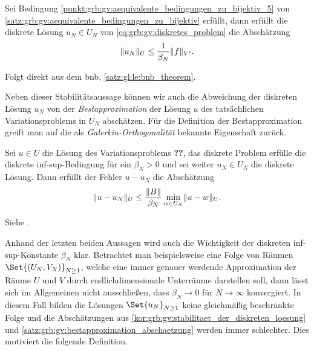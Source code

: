 \begin{Korollar}
\label{kor:grb:gv:stabilitaet_der_diskreten_loesung}
    Sei Bedingung \ref{punkt:grb:gv:aequivalente_bedingungen_zu_bijektiv_5} von \cref{satz:grb:gv:aequivalente_bedingungen_zu_bijektiv} erfüllt, dann erfüllt die diskrete Lösung $u_{N} \in U_{N}$ von \cref{eq:grb:gv:diskretes_problem} die Abschätzung
    \begin{equation}
    \label{eq:grb:gv:stabilitaet_der_diskreten_loesung}
        \lVert u_{N}\rVert_{U} \leq \frac{1}{\beta_{N}} \lVert f\rVert_{V'}.
    \end{equation}

    \begin{Beweis}
        Folgt direkt aus dem \acl{bnb}, \cref{satz:gl:le:bnb_theorem}.
    \end{Beweis}
\end{Korollar}

Neben dieser Stabilitätsaussage können wir auch die Abweichung der diskreten Lösung $u_{N}$ von der \emph{Bestapproximation} der Lösung $u$ des tatsächlichen Variationsproblems in $U_{N}$ abschätzen.
Für die Definition der Bestapproximation greift man auf die als \emph{Galerkin-Orthogonalität} bekannte Eigenschaft zurück.

\begin{Satz}
\label{satz:grb:gv:bestapproximation_abschaetzung}
    Sei $u \in U$ die Lösung des Variationsproblems \textbf{??}, das diskrete Problem erfülle die diskrete inf-sup-Bedingung für ein $\beta_{N} > 0$ und sei weiter $u_{N} \in U_{N}$ die diskrete Lösung.
    Dann erfüllt der Fehler $u - u_{N}$ die Abschätzung
    \begin{equation}
    \label{eq:grb:gv:bestapproximation_abschaetzung}
        \lVert u - u_{N}\rVert_{U} \leq \frac{\lVert B\rVert}{\beta_{N}} \min_{w \in U_{N}} \lVert u - w\rVert_{U}.
    \end{equation}

    \begin{Beweis}
        Siehe \cite[Theorem 3.2]{Nochetto:2009il}.
    \end{Beweis}
\end{Satz}

Anhand der letzten beiden Aussagen wird auch die Wichtigkeit der diskreten inf-sup-Konstante $\beta_{N}$ klar.
Betrachtet man beispielsweise eine Folge von Räumen $\Set{(U_{N}, V_{N})}_{N \geq 1}$, welche eine immer genauer werdende Approximation der Räume $U$ und $V$ durch endlichdimensionale Unterräume darstellen soll, dann lässt sich im Allgemeinen nicht ausschließen, dass $\beta_{N} \to 0$ für $N \to \infty$ konvergiert.
In diesem Fall bilden die Lösungen $\Set{u_{N}}_{N \geq 1}$ keine gleichmäßig beschränkte Folge und die Abschätzungen aus \cref{kor:grb:gv:stabilitaet_der_diskreten_loesung} und \cref{satz:grb:gv:bestapproximation_abschaetzung} werden immer schlechter.
Dies motiviert die folgende Definition.

